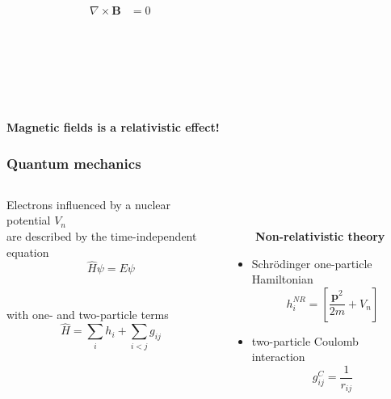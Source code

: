 \documentclass[mathserif,8pt]{beamer}
\begin{document}
\begin{frame}
\begin{columns}
\begin{column}{.35\textwidth}
\begin{align}
	    \nonumber
	    \nabla \times \boldsymbol{B} &= 0
	\end{align}
	\ \\
	\ \\
    \end{column}
    \begin{column}{.20\textwidth}
	\ \\
    \end{column}
    \end{columns}
    \ \\
    \ \\
    \ \\
    \pause
    \centering
    \textbf{Magnetic fields is a relativistic effect!}
\end{frame}

\begin{frame}
    \frametitle{Quantum mechanics}
    \begin{columns}
    \begin{column}{.50\textwidth}
	\centering
	Electrons influenced by a nuclear potential $V_n$\\
	are described by the time-independent equation
	\begin{equation}
	    \nonumber
	    \hat{H} \psi = E \psi
	\end{equation}
	\ \\
	\ \\
	with one- and two-particle terms
	\begin{equation}
	    \nonumber
	    \hat{H} = \sum_i h_i + \sum_{i<j} g_{ij}
	\end{equation}
    \end{column}
    \begin{column}{.4\textwidth}
	\ \\
	\ \\
	\ \ \ \ \textbf{Non-relativistic theory}
	\begin{itemize}
	    \item Schr\"{o}dinger one-particle Hamiltonian
	    \begin{equation}
		\nonumber
		h_i^{NR}  = \left[\frac{\boldsymbol{p}^2}{2m} + V_n\right]
	    \end{equation}
	    \item two-particle Coulomb interaction
	    \begin{equation}
		\nonumber
		g_{ij}^C = \frac{1}{r_{ij}} 
	    \end{equation}
	\end{itemize}
    \end{column}

\end{columns}
\end{frame}
\end{document}
